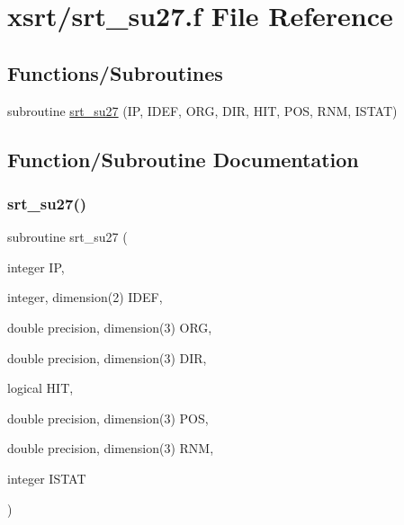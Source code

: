 \hypertarget{srt__su27_8f}{}\section{xsrt/srt\+\_\+su27.f File Reference}
\label{srt__su27_8f}
\subsection*{Functions/\+Subroutines}
\begin{DoxyCompactItemize}
\item 
subroutine \hyperlink{srt__su27_8f_a1a30d457023e55e1f8d1075e6e804923}{srt\+\_\+su27} (IP, I\+D\+EF, O\+RG, D\+IR, H\+IT, P\+OS, R\+NM, I\+S\+T\+AT)
\end{DoxyCompactItemize}


\subsection{Function/\+Subroutine Documentation}
\mbox{\label{srt__su27_8f_a1a30d457023e55e1f8d1075e6e804923}} 
\subsubsection{\texorpdfstring{srt\+\_\+su27()}{srt\_su27()}}
{\footnotesize\ttfamily subroutine srt\+\_\+su27 (\begin{DoxyParamCaption}\item[{integer}]{IP,  }\item[{integer, dimension(2)}]{I\+D\+EF,  }\item[{double precision, dimension(3)}]{O\+RG,  }\item[{double precision, dimension(3)}]{D\+IR,  }\item[{logical}]{H\+IT,  }\item[{double precision, dimension(3)}]{P\+OS,  }\item[{double precision, dimension(3)}]{R\+NM,  }\item[{integer}]{I\+S\+T\+AT }\end{DoxyParamCaption})}

